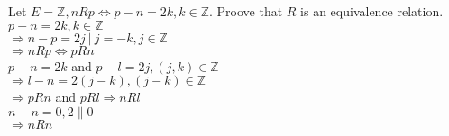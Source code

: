 \documentclass{article}
\begin{document}
\noindent Let $ E = \mathbb{Z}, n R p \iff p - n = 2k, k \in \mathbb{Z} $. Proove that $R$ is an equivalence relation.\\
$ p - n = 2k, k \in \mathbb{Z}$\\
$\Rightarrow n - p = 2j \ | \ j = -k , j \in \mathbb{Z}$\\
$\Rightarrow n R p \iff p R n$\\

\noindent $  p - n = 2k $ and $ p - l = 2j , (j, k) \in \mathbb{Z} $ \\
$\Rightarrow  l - n = 2 (j - k) , (j-k) \in \mathbb{Z}$\\
$\Rightarrow p R n  $ and $ p R l \Rightarrow n R l$ \\

\noindent $ n - n =  0 , 2 \| 0 $\\
$\Rightarrow n R n$
\end{document}
